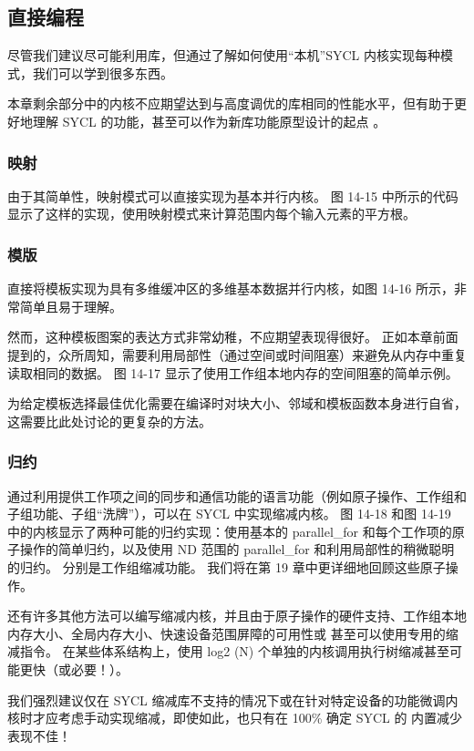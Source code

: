 \subsection{直接编程}
尽管我们建议尽可能利用库，但通过了解如何使用“本机”SYCL 内核实现每种模式，我们可以学到很多东西。

本章剩余部分中的内核不应期望达到与高度调优的库相同的性能水平，但有助于更好地理解 SYCL 的功能，甚至可以作为新库功能原型设计的起点 。

\subsubsection{映射}
由于其简单性，映射模式可以直接实现为基本并行内核。 图 14-15 中所示的代码显示了这样的实现，使用映射模式来计算范围内每个输入元素的平方根。

\subsubsection{模版}
直接将模板实现为具有多维缓冲区的多维基本数据并行内核，如图 14-16 所示，非常简单且易于理解。

然而，这种模板图案的表达方式非常幼稚，不应期望表现得很好。 正如本章前面提到的，众所周知，需要利用局部性（通过空间或时间阻塞）来避免从内存中重复读取相同的数据。 图 14-17 显示了使用工作组本地内存的空间阻塞的简单示例。

为给定模板选择最佳优化需要在编译时对块大小、邻域和模板函数本身进行自省，这需要比此处讨论的更复杂的方法。

\subsubsection{归约}
通过利用提供工作项之间的同步和通信功能的语言功能（例如原子操作、工作组和子组功能、子组“洗牌”），可以在 SYCL 中实现缩减内核。 图 14-18 和图 14-19 中的内核显示了两种可能的归约实现：使用基本的 parallel\_for 和每个工作项的原子操作的简单归约，以及使用 ND 范围的 parallel\_for 和利用局部性的稍微聪明的归约。 分别是工作组缩减功能。 我们将在第 19 章中更详细地回顾这些原子操作。

还有许多其他方法可以编写缩减内核，并且由于原子操作的硬件支持、工作组本地内存大小、全局内存大小、快速设备范围屏障的可用性或 甚至可以使用专用的缩减指令。 在某些体系结构上，使用 log2 (N) 个单独的内核调用执行树缩减甚至可能更快（或必要！）。

我们强烈建议仅在 SYCL 缩减库不支持的情况下或在针对特定设备的功能微调内核时才应考虑手动实现缩减，即使如此，也只有在 100\% 确定 SYCL 的 内置减少表现不佳！

